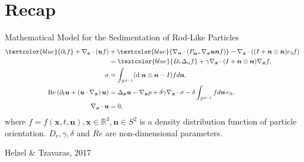 \section{Recap}
\begin{frame}{Mathematical Model for the Sedimentation of Rod-Like Particles}
	\scriptsize
{}
\begin{align*}
	\textcolor{blue}{\partial_t f}+\nabla_{\boldsymbol{x}} \cdot(\boldsymbol{u} f) & +\textcolor{blue}{\nabla_{\boldsymbol{n}} \cdot\left(P_{\boldsymbol{n}^{\perp}} \nabla_{\boldsymbol{x}} \boldsymbol{u} \boldsymbol{n} f\right)}-\nabla_{\boldsymbol{x}} \cdot\left((I+\boldsymbol{n} \otimes \boldsymbol{n}) e_3 f\right) \\
	& =\textcolor{blue}{D_r \Delta_n f}+\gamma \nabla_{\boldsymbol{x}} \notag \cdot(I+\boldsymbol{n} \otimes \boldsymbol{n}) \nabla_{\boldsymbol{x}} f, \\
	\sigma & =\int_{S^{d-1}}(\text{d} \; \boldsymbol{n} \otimes \boldsymbol{n}-I) f d \boldsymbol{n},  \\
	\operatorname{Re}\left(\partial_t \boldsymbol{u}+\left(\boldsymbol{u} \cdot \nabla_{\boldsymbol{x}}\right) \boldsymbol{u}\right) & =\Delta_{\boldsymbol{x}} \boldsymbol{u}-\nabla_{\boldsymbol{x}} p+\delta \gamma \nabla_{\boldsymbol{x}} \cdot \sigma-\delta \int_{S^{d-1}} f d \boldsymbol{n} \, e_3, \\
	\nabla_{\boldsymbol{x}} \cdot \boldsymbol{u} & =0,
\end{align*}
where $f = f(\boldsymbol{x}, t, \boldsymbol{n}), \boldsymbol{x} \in \mathbb{R}^3 , \boldsymbol{n} \in  S^2$ is a density distribution function of particle orientation. $D_r, \gamma, \delta$ and $Re$ are non-dimensional parameters.
\begin{beamercolorbox}[sep=1em,wd=\linewidth,right]{}
	\tiny{Helzel $\&$ Tzavaras, 2017}
\end{beamercolorbox}
\end{frame}


